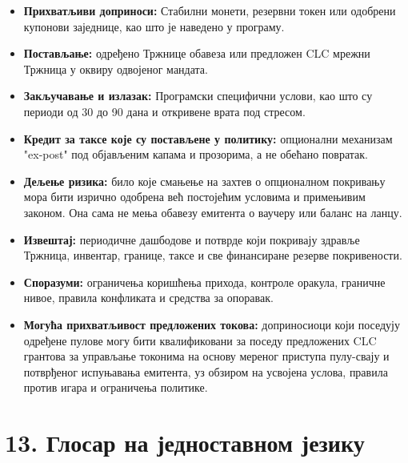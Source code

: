 \documentclass[11pt]{article}
\begin{document}
\begin{itemize}[leftmargin=*]
\item \textbf{Прихватљиви доприноси:} Стабилни монети, резервни токен или одобрени купонови заједнице, као што је наведено у програму.
\item \textbf{Постављање:} одређено Тржнице обавеза или предложен CLC мрежни Тржница у оквиру одвојеног мандата.
\item \textbf{Закључавање и излазак:} Програмски специфични услови, као што су периоди од 30 до 90 дана и откривене врата под стресом.
\item \textbf{Кредит за таксе које су постављене у политику:} опционални механизам "ex-post" под објављеним капама и прозорима, а не обећано повратак.
\item \textbf{Дељење ризика:} било које смањење на захтев о опционалном покривању мора бити изрично одобрена већ постојећим условима и примењивим законом. Она сама не мења обавезу емитента о ваучеру или баланс на ланцу.
\item \textbf{Извештај:} периодичне дашбодове и потврде који покривају здравље Тржница, инвентар, границе, таксе и све финансиране резерве покривености.
\item \textbf{Споразуми:} ограничења коришћења прихода, контроле оракула, граничне нивое, правила конфликата и средства за опоравак.
\item \textbf{Могућа прихватљивост предложених токова:} доприносиоци који поседују одређене пулове могу бити квалификовани за поседу предложених CLC грантова за управљање токонима на основу мереног приступа пулу-свају и потврђеног испуњавања емитента, уз обзиром на усвојена услова, правила против игара и ограничења политике.
\end{itemize}


\section*{13. Глосар на једноставном језику}
\end{document}
